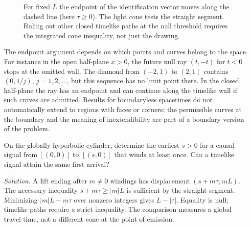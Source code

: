 \begin{figure}[htbp]\centering
{}
\caption{For fixed $L$ the endpoint of the identification vector moves along the dashed line (here $\tau\geq0$). The light cone tests the straight segment. Ruling out other closed timelike paths at the null threshold requires the integrated cone inequality, not just the drawing.}\label{f:shift-cone-figure}
\end{figure}

The endpoint argument depends on which points and curves belong to the space. For instance in the open half-plane $x>0$, the future null ray $(t,-t)$ for $t<0$ stops at the omitted wall. The diamond from $(-2,1)$ to $(2,1)$ contains $(0,1/j)$, $j=1,2,\ldots$, but this sequence has no limit point there. In the closed half-plane the ray has an endpoint and can continue along the timelike wall if such curves are admitted. Results for boundaryless spacetimes do not automatically extend to regions with faces or corners; the permissible curves at the boundary and the meaning of inextendibility are part of a boundary version of the problem.

\begin{exercise}
On the globally hyperbolic cylinder, determine the earliest $s>0$ for a causal signal from $[(0,0)]$ to $[(s,0)]$ that winds at least once. Can a timelike signal attain the same first arrival?

\emph{Solution.} A lift ending after $m\ne0$ windings has displacement $(s+m\tau,mL)$. The necessary inequality $s+m\tau\geq |m|L$ is sufficient by the straight segment. Minimizing $|m|L-m\tau$ over nonzero integers gives $L-|\tau|$. Equality is null; timelike paths require a strict inequality. The comparison measures a global travel time, not a different cone at the point of emission.
\end{exercise}


